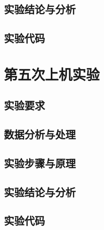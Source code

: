 \documentclass[a4paper,12pt]{report}
\begin{document}
\section{实验结论与分析}
\section{实验代码}
\clearpage
\chapter{第五次上机实验}
\section{实验要求}
\section{数据分析与处理}
\section{实验步骤与原理}
\section{实验结论与分析}
\section{实验代码}
\printbibliography
\end{document}
